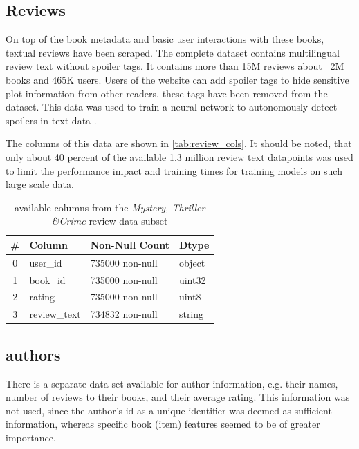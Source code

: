 \documentclass[10pt,final,journal,a4paper,oneside,twocolumn]{IEEEtran}
\begin{document}
\subsection{Reviews}
On top of the book metadata and basic user interactions with these books, textual reviews have been scraped. The complete dataset contains multilingual review text without spoiler tags. It contains more than 15M reviews about ~2M books and 465K users. Users of the website can add spoiler tags to hide sensitive plot information from other readers, these tags have been removed from the dataset. This data was used to train a neural network to autonomously detect spoilers in text data \cite{Wan.2019}.

The columns of this data are shown in \autoref{tab:review_cols}. It should be noted, that only about 40 percent of the available 1.3 million review text datapoints was used to limit the performance impact and training times for training models on such large scale data.
\begin{table}[h]
\begin{center}
        \begin{tabular}{clll}
            \toprule
            \# & Column & Non-Null Count & Dtype \\
            \midrule
            0 & user\_id & 735000 non-null & object \\
            1 & book\_id & 735000 non-null & uint32 \\
            2 & rating & 735000 non-null & uint8 \\
            3 & review\_text & 734832 non-null & string \\
            \bottomrule
            \end{tabular}        
            \caption{available columns from the \emph{Mystery, Thriller \&Crime} review data subset}
            \label{tab:review_cols}
    
\end{center}\end{table}

\subsection{authors}
There is a separate data set available for author information, e.g. their names, number of reviews to their books, and their average rating. This information was not used, since the author's id as a unique identifier was deemed as sufficient information, whereas specific book (item) features seemed to be of greater importance.
\end{document}
